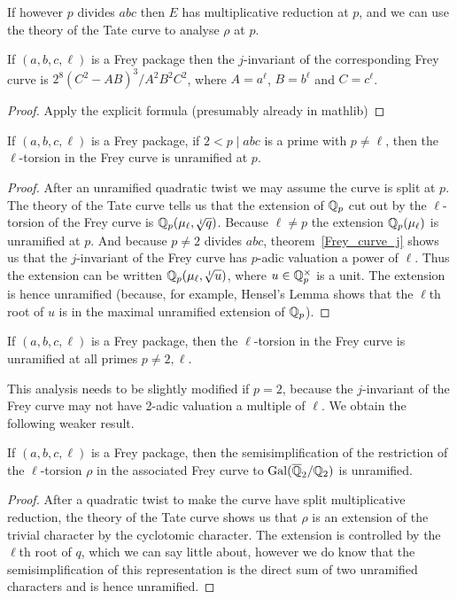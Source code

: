 If however $p$ divides $abc$ then $E$ has multiplicative 
reduction at $p$, and we can use the theory of the Tate curve to analyse $\rho$ at $p$.

\begin{theorem}\label{Frey_curve_j} If $(a,b,c,\ell)$ is a Frey package then the $j$-invariant of the corresponding Frey curve is $2^8(C^2-AB)^3/A^2B^2C^2$, where $A=a^\ell$, $B=b^\ell$ and $C=c^\ell$.
\end{theorem}
\begin{proof}
  Apply the explicit formula (presumably already in mathlib)
\end{proof}

\begin{corollary}\label{Frey_curve_unram} If $(a,b,c,\ell)$ is a Frey package, if $2<p\mid abc$
  is a prime with $p\not=\ell$, then the $\ell$-torsion in the Frey curve is unramified
  at $p$.
\end{corollary}
\begin{proof} After an unramified quadratic twist we may assume the curve is split at $p$.
  The theory of the Tate curve tells us that the extension of $\mathbb{Q}_p$ cut out by the $\ell$-torsion
  of the Frey curve is $\mathbb{Q}_p(\mu_\ell,\sqrt[l]{q})$. Because $\ell\not=p$ the extension
  $\mathbb{Q}_p(\mu_\ell)$ is unramified at $p$. And because $p\not=2$ divides $abc$, 
  theorem~\ref{Frey_curve_j} shows us that the $j$-invariant of the Frey curve has $p$-adic
  valuation a power of $\ell$. Thus the extension can be written $\mathbb{Q}_p(\mu_\ell,\sqrt[l]{u})$,
  where $u\in\mathbb{Q}_p^\times$ is a unit. The extension is hence unramified (because, for example,
  Hensel's Lemma shows that the $\ell$th root of $u$ is in the maximal unramified
  extension of $\mathbb{Q}_p$).
\end{proof}

\begin{corollary}\label{frey_curve_unramified} If $(a,b,c,\ell)$ is a Frey package, then the $\ell$-torsion in the Frey curve is unramified at all primes $p\not=2,\ell$.
\end{corollary}

This analysis needs to be slightly modified if $p=2$, because the $j$-invariant of
the Frey curve may not have 2-adic valuation a multiple of $\ell$. We obtain the
following weaker result.

\begin{corollary}\label{frey_curve_at_2} If $(a,b,c,\ell)$ is a Frey package, then the 
  semisimplification of the restriction of the $\ell$-torsion $\rho$ in the associated Frey curve 
  to $\operatorname{Gal}(\overline{\mathbb{Q}}_2/\mathbb{Q}_2)$ is unramified.
\end{corollary}
\begin{proof} After a quadratic twist to make the curve have split multiplicative
  reduction, the theory of the Tate curve shows us that $\rho$ is an extension
  of the trivial character by the cyclotomic character. The extension is controlled
  by the $\ell$th root of $q$, which we can say little about, however we do know
  that the semisimplification of this representation is the direct sum of two
  unramified characters and is hence unramified.
\end{proof}

